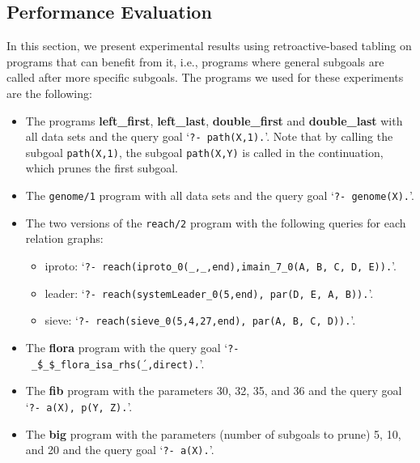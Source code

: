 


\subsection{Performance Evaluation}

In this section, we present experimental results using retroactive-based tabling on programs that
can benefit from it, i.e., programs where general subgoals are called after more specific subgoals.
The programs we used for these experiments are the following:

\begin{itemize}
   \item The programs \textbf{left\_first}, \textbf{left\_last}, \textbf{double\_first} and \textbf{double\_last}
   with all data sets and the query goal `\texttt{?-~path(X,1).}'. Note that by calling the subgoal \texttt{path(X,1)},
   the subgoal \texttt{path(X,Y)} is called in the continuation, which prunes the first subgoal.
   
   \item The \texttt{genome/1} program with all data sets and the query goal `\texttt{?-~genome(X).}'.
   
   \item The two versions of the \texttt{reach/2} program with the following queries for each relation graphs:

   \begin{itemize}
      \item iproto: `\texttt{?-~reach(iproto\_0(\_,\_,end),imain\_7\_0(A,~B,~C,~D,~E)).}'.
      \item leader: `\texttt{?-~reach(systemLeader\_0(5,end),~par(D,~E,~A,~B)).}'.
      \item sieve: `\texttt{?-~reach(sieve\_0(5,4,27,end),~par(A,~B,~C,~D)).}'.
   \end{itemize}
   
   \item The \textbf{flora} program with the query goal `\texttt{?-~\'\_\$\_\$\_flora\_isa\_rhs\'(\_,direct).}'.
   
   \item The \textbf{fib} program with the parameters 30, 32, 35, and 36 and the query goal `\texttt{?-~a(X),~p(Y,~Z).}'.
   
   \item The \textbf{big} program with the parameters (number of subgoals to prune) 5, 10, and 20 and the
   query goal `\texttt{?-~a(X).}'.
\end{itemize}

